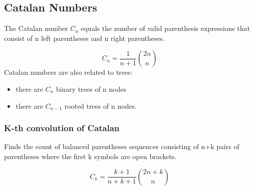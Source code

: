 \subsection{Catalan Numbers}
The Catalan number $C_{n}$ equals the number of valid parenthesis expressions that consist of n left parentheses and n right parentheses.

\begin{equation*}
    C_{n} = \dfrac{1}{n + 1} \binom{2n}{n}
\end{equation*}
\newline
Catalan numbers are also related to trees:

\begin{itemize}
    \item there are $C_{n}$ binary trees of n nodes
    \item there are $C_{n-1}$ rooted trees of n nodes.
\end{itemize}

\subsubsection{K-th convolution of Catalan}
Finds the count of balanced parentheses sequences consisting of n+k pairs of parentheses where the first k symbols are open brackets.

\begin{equation*}
    C_{k} = \dfrac{k + 1}{n + k + 1} \binom{2n + k}{n}
\end{equation*}
